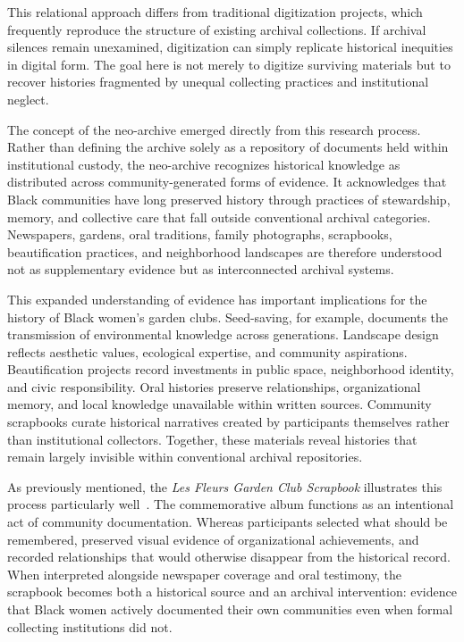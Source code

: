 \documentclass[final]{anthology-ch}
\begin{document}
This relational approach differs from traditional digitization projects, which frequently reproduce the structure of existing archival collections. If archival silences remain unexamined, digitization can simply replicate historical inequities in digital form. The goal here is not merely to digitize surviving materials but to recover histories fragmented by unequal collecting practices and institutional neglect.

The concept of the neo-archive emerged directly from this research process. Rather than defining the archive solely as a repository of documents held within institutional custody, the neo-archive recognizes historical knowledge as distributed across community-generated forms of evidence. It acknowledges that Black communities have long preserved history through practices of stewardship, memory, and collective care that fall outside conventional archival categories. Newspapers, gardens, oral traditions, family photographs, scrapbooks, beautification practices, and neighborhood landscapes are therefore understood not as supplementary evidence but as interconnected archival systems.

This expanded understanding of evidence has important implications for the history of Black women's garden clubs. Seed-saving, for example, documents the transmission of environmental knowledge across generations. Landscape design reflects aesthetic values, ecological expertise, and community aspirations. Beautification projects record investments in public space, neighborhood identity, and civic responsibility. Oral histories preserve relationships, organizational memory, and local knowledge unavailable within written sources. Community scrapbooks curate historical narratives created by participants themselves rather than institutional collectors. Together, these materials reveal histories that remain largely invisible within conventional archival repositories.

As previously mentioned, the \textit{Les Fleurs Garden Club Scrapbook} illustrates this process particularly well~\cite{lesfleurs}. The commemorative album functions as an intentional act of community documentation. Whereas participants selected what should be remembered, preserved visual evidence of organizational achievements, and recorded relationships that would otherwise disappear from the historical record. When interpreted alongside newspaper coverage and oral testimony, the scrapbook becomes both a historical source and an archival intervention: evidence that Black women actively documented their own communities even when formal collecting institutions did not.
\end{document}
